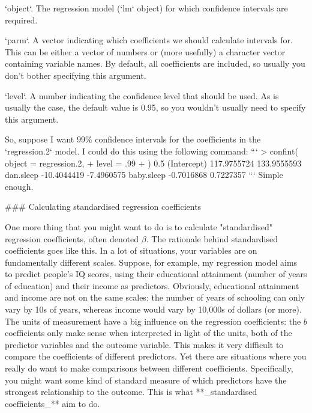 \item `object`. The regression model (`lm` object) for which confidence intervals are required.
\item `parm`. A vector indicating which coefficients we should calculate intervals for. This can be either a vector of numbers or (more usefully) a character vector containing variable names. By default, all coefficients are included, so usually you don't bother specifying this argument.
\item `level`. A number indicating the confidence level that should be used. As is usually the case, the default value is 0.95, so you wouldn't usually need to specify this argument.

So, suppose I want 99\% confidence intervals for the coefficients in the `regression.2` model. I could do this using the following command:
```
> confint( object = regression.2,
+          level = .99
+ )
                  0.5 %
(Intercept) 117.9755724 133.9555593
dan.sleep   -10.4044419  -7.4960575
baby.sleep   -0.7016868   0.7227357
```
Simple enough.



### Calculating standardised regression coefficients

One more thing that you might want to do is to calculate "standardised" regression coefficients, often denoted $\beta$. The rationale behind standardised coefficients goes like this. In a lot of situations, your variables are on fundamentally different scales. Suppose, for example, my regression model aims to predict people's IQ scores, using their educational attainment (number of years of education) and their income as predictors. Obviously, educational attainment and income are not on the same scales: the number of years of schooling can only vary by 10s of years, whereas income would vary by 10,000s of dollars (or more). The units of measurement have a big influence on the regression coefficients: the $b$ coefficients only make sense when interpreted in light of the units, both of the predictor variables and the outcome variable. This makes it very difficult to compare the coefficients of different predictors. Yet there are situations where you really do want to make comparisons between different coefficients. Specifically, you might want some kind of standard measure of which predictors have the strongest relationship to the outcome. This is what **_standardised coefficients_** aim to do. 

